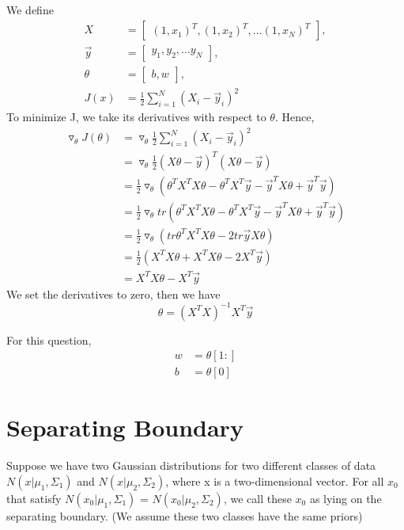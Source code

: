 \documentclass{article}
\newenvironment{answer}{\par\color{ForestGreen}}{\par}
\begin{document}
\begin{answer}
We define  \begin{align*}X &= \begin{bmatrix}(1, x_1)^T, (1, x_2)^T,...(1, x_N)^T \end{bmatrix},\\
                   \vec{y} &= \begin{bmatrix} y_1, y_2,...y_N \end{bmatrix},\\
                    \theta &= \begin{bmatrix} b, w \end{bmatrix}, \\
                      J(x) &= \frac{1}{2}\sum_{i=1}^N(X_i-\vec{y}_i)^2
    \end{align*}
To minimize J, we take its derivatives with respect to $\theta$. Hence,
 \begin{align*}\triangledown_\theta J(\theta) &= \triangledown_\theta \frac{1}{2}\sum_{i=1}^N(X_i-\vec{y}_i)^2 \\
                          &= \triangledown_\theta \frac{1}{2}(X\theta - \vec{y})^T(X\theta - \vec{y}) \\
                          &= \frac{1}{2} \triangledown_\theta(\theta^T X^TX\theta- \theta^TX^T\vec{y} - \vec{y}^TX\theta + \vec{y}^T\vec{y}) \\
                          &= \frac{1}{2} \triangledown_\theta tr(\theta^T X^TX\theta- \theta^TX^T\vec{y} - \vec{y}^TX\theta + \vec{y}^T\vec{y}) \\
                          &= \frac{1}{2} \triangledown_\theta(tr\theta^T X^TX\theta - 2tr\vec{y}X\theta) \\
                          &= \frac{1}{2} (X^TX\theta + X^TX\theta - 2X^T\vec{y}) \\
                          &= X^TX\theta - X^T\vec{y}
  \end{align*}
We set the derivatives to zero, then we have $$\theta = (X^TX)^{-1}X^T\vec{y}$$

For this question,
\begin{align*} w & = \theta[1:] \\
               b & = \theta[0]
 \end{align*}

\end{answer}

\section{Separating Boundary}
Suppose we have two Gaussian distributions for two different classes of data $N(x|\mu_1, \Sigma_1)$
and $N(x|\mu_2, \Sigma_2)$, where x is a two-dimensional vector. For all $x_0$ that satisfy $N(x_0|\mu_1, \Sigma_1)$ =
$N(x_0|\mu_2, \Sigma_2)$, we call these $x_0$ as lying on the separating boundary. (We assume these
two classes have the same priors)
\end{document}
